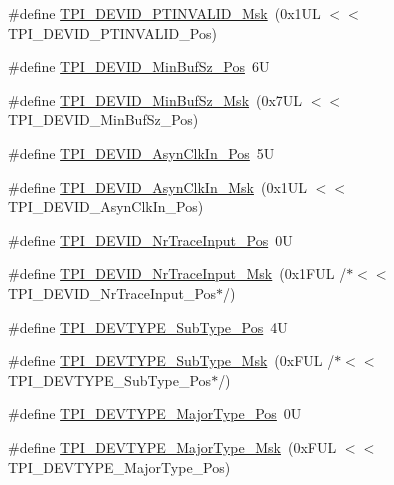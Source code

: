 \begin{DoxyCompactItemize}
\item 
\#define \hyperlink{group___c_m_s_i_s___t_p_i_ga1ca84d62243e475836bba02516ba6b97}{T\+P\+I\+\_\+\+D\+E\+V\+I\+D\+\_\+\+P\+T\+I\+N\+V\+A\+L\+I\+D\+\_\+\+Msk}~(0x1\+U\+L $<$$<$ T\+P\+I\+\_\+\+D\+E\+V\+I\+D\+\_\+\+P\+T\+I\+N\+V\+A\+L\+I\+D\+\_\+\+Pos)
\item 
\#define \hyperlink{group___c_m_s_i_s___t_p_i_ga3f7da5de2a34be41a092e5eddd22ac4d}{T\+P\+I\+\_\+\+D\+E\+V\+I\+D\+\_\+\+Min\+Buf\+Sz\+\_\+\+Pos}~6U
\item 
\#define \hyperlink{group___c_m_s_i_s___t_p_i_ga939e068ff3f1a65b35187ab34a342cd8}{T\+P\+I\+\_\+\+D\+E\+V\+I\+D\+\_\+\+Min\+Buf\+Sz\+\_\+\+Msk}~(0x7\+U\+L $<$$<$ T\+P\+I\+\_\+\+D\+E\+V\+I\+D\+\_\+\+Min\+Buf\+Sz\+\_\+\+Pos)
\item 
\#define \hyperlink{group___c_m_s_i_s___t_p_i_gab382b1296b5efd057be606eb8f768df8}{T\+P\+I\+\_\+\+D\+E\+V\+I\+D\+\_\+\+Asyn\+Clk\+In\+\_\+\+Pos}~5U
\item 
\#define \hyperlink{group___c_m_s_i_s___t_p_i_gab67830557d2d10be882284275025a2d3}{T\+P\+I\+\_\+\+D\+E\+V\+I\+D\+\_\+\+Asyn\+Clk\+In\+\_\+\+Msk}~(0x1\+U\+L $<$$<$ T\+P\+I\+\_\+\+D\+E\+V\+I\+D\+\_\+\+Asyn\+Clk\+In\+\_\+\+Pos)
\item 
\#define \hyperlink{group___c_m_s_i_s___t_p_i_ga80ecae7fec479e80e583f545996868ed}{T\+P\+I\+\_\+\+D\+E\+V\+I\+D\+\_\+\+Nr\+Trace\+Input\+\_\+\+Pos}~0U
\item 
\#define \hyperlink{group___c_m_s_i_s___t_p_i_gabed454418d2140043cd65ec899abd97f}{T\+P\+I\+\_\+\+D\+E\+V\+I\+D\+\_\+\+Nr\+Trace\+Input\+\_\+\+Msk}~(0x1\+F\+U\+L /$\ast$$<$$<$ T\+P\+I\+\_\+\+D\+E\+V\+I\+D\+\_\+\+Nr\+Trace\+Input\+\_\+\+Pos$\ast$/)
\item 
\#define \hyperlink{group___c_m_s_i_s___t_p_i_ga0c799ff892af5eb3162d152abc00af7a}{T\+P\+I\+\_\+\+D\+E\+V\+T\+Y\+P\+E\+\_\+\+Sub\+Type\+\_\+\+Pos}~4U
\item 
\#define \hyperlink{group___c_m_s_i_s___t_p_i_ga5b2fd7dddaf5f64855d9c0696acd65c1}{T\+P\+I\+\_\+\+D\+E\+V\+T\+Y\+P\+E\+\_\+\+Sub\+Type\+\_\+\+Msk}~(0x\+F\+U\+L /$\ast$$<$$<$ T\+P\+I\+\_\+\+D\+E\+V\+T\+Y\+P\+E\+\_\+\+Sub\+Type\+\_\+\+Pos$\ast$/)
\item 
\#define \hyperlink{group___c_m_s_i_s___t_p_i_ga69c4892d332755a9f64c1680497cebdd}{T\+P\+I\+\_\+\+D\+E\+V\+T\+Y\+P\+E\+\_\+\+Major\+Type\+\_\+\+Pos}~0U
\item 
\#define \hyperlink{group___c_m_s_i_s___t_p_i_gaecbceed6d08ec586403b37ad47b38c88}{T\+P\+I\+\_\+\+D\+E\+V\+T\+Y\+P\+E\+\_\+\+Major\+Type\+\_\+\+Msk}~(0x\+F\+U\+L $<$$<$ T\+P\+I\+\_\+\+D\+E\+V\+T\+Y\+P\+E\+\_\+\+Major\+Type\+\_\+\+Pos)

\end{DoxyCompactItemize}
